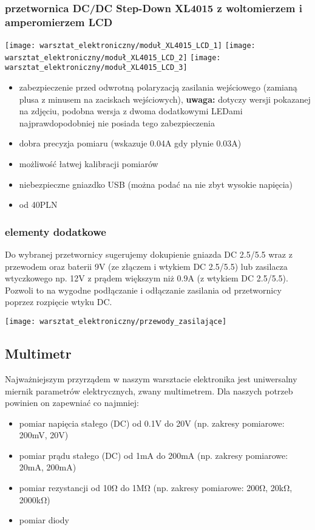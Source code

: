 \documentclass{pdfBooklets}
\newcommand\zaleta{\item[\textbf{\ttfamily +}]}
\newcommand\wada{\item[\textbf{\ttfamily -}]}
\newcommand\info{\item[\textbf{\ttfamily *}]}
\begin{document}
	\subsubsection{przetwornica DC/DC Step-Down XL4015 z woltomierzem i amperomierzem LCD}
		\begin{center}
			\texttt{[image: warsztat\_elektroniczny/moduł\_XL4015\_LCD\_1]}
			\hspace{0.5cm}
			\texttt{[image: warsztat\_elektroniczny/moduł\_XL4015\_LCD\_2]}
			\hspace{0.5cm}
			\texttt{[image: warsztat\_elektroniczny/moduł\_XL4015\_LCD\_3]}
		\end{center}
		\begin{itemize}
			\zaleta  zabezpieczenie przed odwrotną polaryzacją zasilania wejściowego (zamianą plusa z minusem na zaciskach wejściowych),
				\textbf{uwaga:} dotyczy wersji pokazanej na zdjęciu, podobna wersja z dwoma dodatkowymi LEDami najprawdopodobniej nie posiada tego zabezpieczenia
			\zaleta  dobra precyzja pomiaru (wskazuje 0.04A gdy płynie 0.03A)
			\zaleta  możliwość łatwej kalibracji pomiarów
			\wada niebezpieczne gniazdko USB (można podać na nie zbyt wysokie napięcia)
			\info od 40PLN
		\end{itemize}
		
	\subsubsection{elementy dodatkowe}
	Do wybranej przetwornicy sugerujemy dokupienie gniazda DC 2.5/5.5 wraz z przewodem oraz baterii 9V (ze złączem i wtykiem DC 2.5/5.5) lub zasilacza wtyczkowego np. 12V z prądem większym niż 0.9A (z wtykiem DC 2.5/5.5). Pozwoli to na wygodne podłączanie i odłączanie zasilania od przetwornicy poprzez rozpięcie wtyku DC.
	\begin{center}
		\texttt{[image: warsztat\_elektroniczny/przewody\_zasilające]}
	\end{center}

\subsection{Multimetr}
	Najważniejszym przyrządem w naszym warsztacie elektronika jest uniwersalny miernik parametrów elektrycznych, zwany multimetrem.
	Dla naszych potrzeb powinien on zapewniać co najmniej:
	\begin{itemize}
		\item pomiar napięcia stałego (DC) od 0.1V do 20V (np. zakresy pomiarowe: 200mV, 20V)
		\item pomiar prądu stałego (DC) od 1mA do 200mA (np. zakresy pomiarowe: 20mA, 200mA)
		\item pomiar rezystancji od 10Ω do 1MΩ (np. zakresy pomiarowe: 200Ω, 20kΩ, 2000kΩ)
		\item pomiar diody
	\end{itemize}
	
\end{document}
